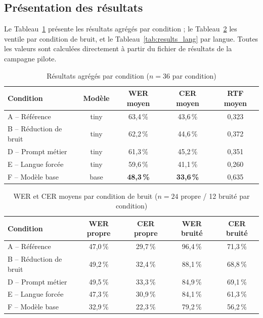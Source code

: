 \documentclass[12pt]{report}
\begin{document}
\subsection{Présentation des résultats}
Le Tableau~\ref{tab:results_agg} présente les résultats agrégés par condition ; le Tableau~\ref{tab:results_noise} les ventile par condition de bruit, et le Tableau~\ref{tab:results_lang} par langue. Toutes les valeurs sont calculées directement à partir du fichier de résultats de la campagne pilote.
\begin{table}[H]
\centering
\begin{tabular}{|l|c|c|c|c|}
\hline
\textbf{Condition} & \textbf{Modèle} & \textbf{WER moyen} & \textbf{CER moyen} & \textbf{RTF moyen} \\ \hline
A -- Référence & tiny & 63,4\,\% & 43,6\,\% & 0,323 \\ \hline
B -- Réduction de bruit & tiny & 62,2\,\% & 44,6\,\% & 0,372 \\ \hline
D -- Prompt métier & tiny & 61,3\,\% & 45,2\,\% & 0,351 \\ \hline
E -- Langue forcée & tiny & 59,6\,\% & 41,1\,\% & 0,260 \\ \hline
F -- Modèle base & base & \textbf{48,3\,\%} & \textbf{33,6\,\%} & 0,635 \\ \hline
\end{tabular}
\caption{Résultats agrégés par condition ($n=36$ par condition)}
\label{tab:results_agg}
\end{table}
\begin{table}[H]
\centering
\begin{tabular}{|l|c|c|c|c|}
\hline
\textbf{Condition} & \textbf{WER propre} & \textbf{CER propre} & \textbf{WER bruité} & \textbf{CER bruité} \\ \hline
A -- Référence & 47,0\,\% & 29,7\,\% & 96,4\,\% & 71,3\,\% \\ \hline
B -- Réduction de bruit & 49,2\,\% & 32,4\,\% & 88,1\,\% & 68,8\,\% \\ \hline
D -- Prompt métier & 49,5\,\% & 33,3\,\% & 84,9\,\% & 69,1\,\% \\ \hline
E -- Langue forcée & 47,3\,\% & 30,9\,\% & 84,1\,\% & 61,3\,\% \\ \hline
F -- Modèle base & 32,9\,\% & 22,3\,\% & 79,2\,\% & 56,2\,\% \\ \hline
\end{tabular}
\caption{WER et CER moyens par condition de bruit ($n=24$ propre / 12 bruité par condition)}
\label{tab:results_noise}
\end{table}
\end{document}

